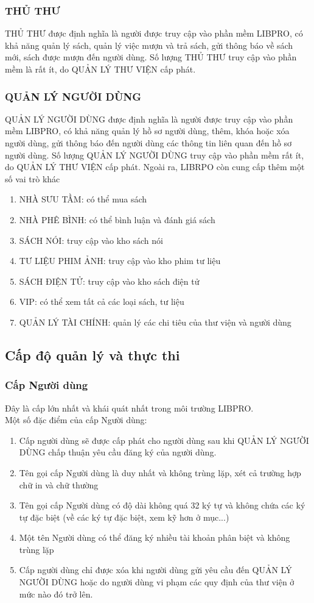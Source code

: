 \documentclass[12pt,a4paper]{report}
\begin{document}
			\subsubsection{THỦ THƯ}
				THỦ THƯ được định nghĩa là người được truy cập vào phần mềm LIBPRO, có khả năng quản lý sách, quản lý việc mượn và trả sách, gửi thông báo về sách mới, sách được mượn đến người dùng.
				Số lượng THỦ THƯ truy cập vào phần mềm là rất ít, do QUẢN LÝ THƯ VIỆN cấp phát.
			\subsubsection{QUẢN LÝ NGƯỜI DÙNG}
				QUẢN LÝ NGƯỜI DÙNG được định nghĩa là người được truy cập vào phần mềm LIBPRO, có khả năng quản lý hồ sơ người dùng, thêm, khóa hoặc xóa người dùng, gửi thông báo đến người dùng các thông tin liên quan đến hồ sơ người dùng.
				Số lượng QUẢN LÝ NGƯỜI DÙNG truy cập vào phần mềm rất ít, do QUẢN LÝ THƯ VIỆN cấp phát.
		Ngoài ra, LIBRPO còn cung cấp thêm một số vai trò khác
		\begin{enumerate}
			\item NHÀ SƯU TẦM: có thể mua sách
			\item NHÀ PHÊ BÌNH: có thể bình luận và đánh giá sách
			\item SÁCH NÓI: truy cập vào kho sách nói
			\item TƯ LIỆU PHIM ẢNH: truy cập vào kho phim tư liệu
			\item SÁCH ĐIỆN TỬ: truy cập vào kho sách điện tử
			\item VIP: có thể xem tất cả các loại sách, tư liệu
			\item QUẢN LÝ TÀI CHÍNH: quản lý các chi tiêu của thư viện và người dùng
		\end{enumerate}
		\subsection{Cấp độ quản lý và thực thi}
			\subsubsection{Cấp Người dùng}
			Đây là cấp lớn nhất và khái quát nhất trong môi trường LIBPRO.\\
			Một số đặc điểm của cấp Người dùng:
			\begin{enumerate}
				\item Cấp người dùng sẽ được cấp phát cho người dùng sau khi QUẢN LÝ NGƯỜI DÙNG chấp thuận yêu cầu đăng ký của người dùng.
				\item Tên gọi cấp Người dùng là duy nhất và không trùng lặp, xét cả trường hợp chữ in và chữ thường
				\item Tên gọi cấp Người dùng có độ dài không quá 32 ký tự và không chứa các ký tự đặc biệt (về các ký tự đặc biệt, xem kỹ hơn ở mục...)
				\item Một tên Người dùng có thể đăng ký nhiều tài khoản phân biệt và không trùng lặp
				\item Cấp người dùng chỉ được xóa khi người dùng gửi yêu cầu đến QUẢN LÝ NGƯỜI DÙNG hoặc do người dùng vi phạm các quy định của thư viện ở mức nào đó trở lên.
			\end{enumerate}
\end{document}
